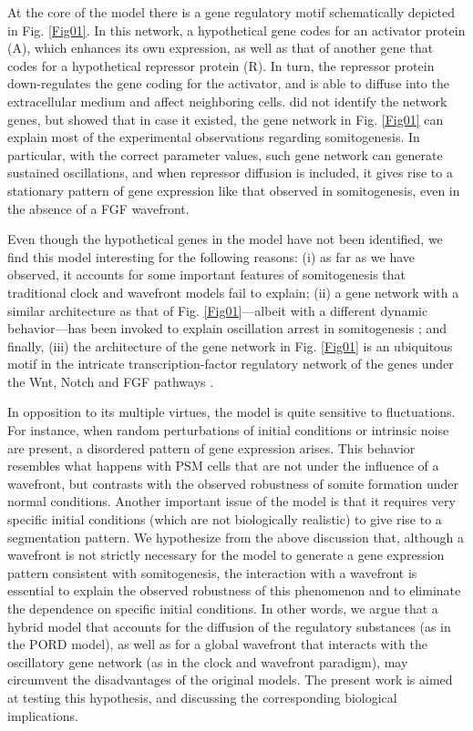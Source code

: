 \documentclass[11pt]{article}
\begin{document}
	At the core of the \citeauthor{Cotterell2015} model there is a gene regulatory
	motif schematically depicted in Fig. \ref{Fig01}. In this network, a
	hypothetical gene codes for an activator protein (A), which enhances its own
	expression, as well as that of another gene that codes for a hypothetical
	repressor protein (R). In turn, the repressor protein down-regulates the gene
	coding for the activator, and is able to diffuse into the extracellular medium
	and affect neighboring cells. \citeauthor{Cotterell2015} did not identify the
	network genes, but showed that in case it existed, the gene network in Fig.
	\ref{Fig01} can explain most of the experimental observations regarding
	somitogenesis. In particular, with the correct parameter values, such gene
	network can generate sustained oscillations, and when repressor diffusion is
	included, it gives rise to a stationary pattern of gene expression like that
	observed in somitogenesis, even in the absence of a FGF wavefront.
	
	Even though the hypothetical genes in the \citeauthor{Cotterell2015} model have
	not been identified, we find this model interesting for the following reasons:
	(i) as far as we have observed, it accounts for some important features of
	somitogenesis that traditional clock and wavefront models fail to explain; (ii)
	a gene network with a similar architecture as that of Fig. \ref{Fig01}---albeit
	with a different dynamic behavior---has been invoked to explain oscillation
	arrest in somitogenesis \citep{Santillan2008, Zavala2012}; and finally, (iii)
	the architecture of the gene network in Fig. \ref{Fig01} is an ubiquitous motif
	in the intricate transcription-factor regulatory network of the genes under the
	Wnt, Notch and FGF pathways \citep{Gibb2010, Zavala2012}.
	
	In opposition to its multiple virtues, the \citeauthor{Cotterell2015} model is
	quite sensitive to fluctuations. For instance, when random perturbations of
	initial conditions or intrinsic noise are present, a disordered pattern of gene
	expression arises. This behavior resembles what happens with PSM cells that are
	not under the influence of a wavefront, but contrasts with the observed
	robustness of somite formation under normal conditions. Another important issue 
	of the \citeauthor{Cotterell2015} model is that it requires very specific initial
	conditions (which are not biologically realistic) 
	to give rise to a segmentation pattern. We hypothesize from the
	above discussion that, although a wavefront is not strictly necessary for the
	\citeauthor{Cotterell2015} model to generate a gene expression pattern
	consistent with somitogenesis, the interaction with a wavefront is essential to
	explain the observed robustness of this phenomenon and to eliminate the dependence
	on specific initial conditions. In other words, we argue 
	that a hybrid model that accounts for the diffusion of the regulatory substances
	(as in the PORD model), as well as for a global wavefront that interacts
	with the oscillatory gene network (as in the clock and wavefront paradigm), 
	may circumvent the disadvantages of the original models. The present work is aimed at
	testing this hypothesis, and discussing the corresponding biological
	implications.
	
\end{document}
